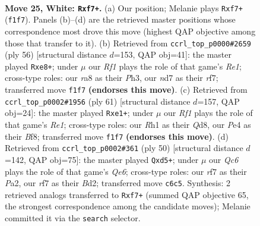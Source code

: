 \documentclass[11pt]{article}
\begin{document}
\clearpage

\begin{figure}[p]\centering
\begin{subfigure}{0.46\textwidth}\centering
\resizebox{\linewidth}{!}{%
\newchessgame
\chessboard[
  setfen={r2q1b2/3nkr2/2Qn2p1/2pP4/4P3/1PN5/P2K4/5R1R w - - 0 25},
  showmover=false,
  pgfstyle=straightmove, color=movearrow, markmove={f1-f7}
]}
\caption{}
\end{subfigure}\hfill
\begin{subfigure}{0.46\textwidth}\centering
\resizebox{\linewidth}{!}{%
\newchessgame
\chessboard[
  setfen={4r1k1/3q1rp1/1Q5p/P1n5/1p1p4/7P/5PP1/2R1R1K1 w - - 0 29},
  showmover=false,
  pgfstyle=straightmove, color=movearrow, markmove={e1-e8}
]}
\caption{}
\end{subfigure}
\\[4pt]
\begin{subfigure}{0.46\textwidth}\centering
\resizebox{\linewidth}{!}{%
\newchessgame
\chessboard[
  setfen={3qrb2/pp5k/6pp/3p1r2/3p4/1P1P1N1R/P2Q2B1/4R1K1 b - - 3 31},
  showmover=false,
  pgfstyle=straightmove, color=movearrow, markmove={e8-e1}
]}
\caption{}
\end{subfigure}\hfill
\begin{subfigure}{0.46\textwidth}\centering
\resizebox{\linewidth}{!}{%
\newchessgame
\chessboard[
  setfen={3k3r/2q1b1Rp/4Q3/3n4/p7/2Pn4/Pr1B2PP/4R2K w - - 0 26},
  showmover=false,
  pgfstyle=straightmove, color=movearrow, markmove={e6-d5}
]}
\caption{}
\end{subfigure}
\caption{\textbf{Move 25, White: \texttt{Rxf7+}.} (a) Our position; Melanie plays \texttt{Rxf7+} (\texttt{f1f7}). Panels (b)--(d) are the retrieved master positions whose correspondence most drove this move (highest QAP objective among those that transfer to it). (b) Retrieved from \texttt{ccrl\_top\_p0000\#2659} (ply 56) [structural distance $d$=153, QAP obj=41]: the master played \texttt{Rxe8+}; under $\mu$ our \emph{Rf1} plays the role of that game's \emph{Re1}; cross-type roles: our \emph{r}a8 as their \emph{P}h3, our \emph{n}d7 as their \emph{r}f7; transferred move \texttt{f1f7} \textbf{(endorses this move)}. (c) Retrieved from \texttt{ccrl\_top\_p0002\#1956} (ply 61) [structural distance $d$=157, QAP obj=24]: the master played \texttt{Rxe1+}; under $\mu$ our \emph{Rf1} plays the role of that game's \emph{Re1}; cross-type roles: our \emph{R}h1 as their \emph{Q}d8, our \emph{P}e4 as their \emph{B}f8; transferred move \texttt{f1f7} \textbf{(endorses this move)}. (d) Retrieved from \texttt{ccrl\_top\_p0002\#361} (ply 50) [structural distance $d$=142, QAP obj=75]: the master played \texttt{Qxd5+}; under $\mu$ our \emph{Qc6} plays the role of that game's \emph{Qe6}; cross-type roles: our \emph{r}f7 as their \emph{P}a2, our \emph{r}f7 as their \emph{B}d2; transferred move \texttt{c6c5}. Synthesis: 2 retrieved analogs transferred to \texttt{Rxf7+} (summed QAP objective 65, the strongest correspondence among the candidate moves); Melanie committed it via the \texttt{search} selector.}
\label{fig:thought-m48}
\end{figure}
\end{document}
